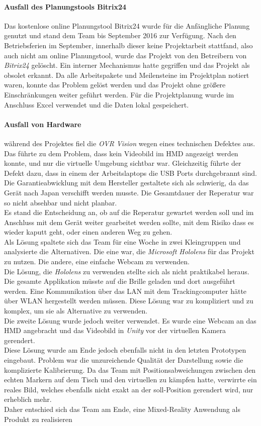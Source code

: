\paragraph{Ausfall des Planungstools Bitrix24} Das kostenlose online Planungstool Bitrix24 wurde für die Anfängliche Planung genutzt und stand dem Team bis September 2016 zur Verfügung. Nach den Betriebsferien im September, innerhalb dieser keine Projektarbeit stattfand, also auch nicht am online Planungstool, wurde das Projekt von den Betreibern von \textit{Bitrix24} gelöscht. Ein interner Mechanismus hatte gegriffen und das Projekt als obsolet erkannt. Da alle Arbeitspakete und Meilensteine im Projektplan notiert waren, konnte das Problem gelöst werden und das Projekt ohne größere Einschränkungen weiter geführt werden. Für die Projektplanung wurde im Anschluss Excel verwendet und die Daten lokal gespeichert.

\paragraph{Ausfall von Hardware} während des Projektes fiel die \textit{OVR Vision} wegen eines technischen Defektes aus. Das führte zu dem Problem, dass kein Videobild im HMD angezeigt werden konnte, und nur die virtuelle Umgebung sichtbar war. Gleichzeitig führte der Defekt dazu, dass in einem der Arbeitslaptops die USB Ports durchgebrannt sind. Die Garantieabwicklung mit dem Hersteller gestaltete sich als schwierig, da das Gerät nach Japan verschifft werden musste. Die Gesamtdauer der Reperatur war so nicht absehbar und nicht planbar. \\
Es stand die Entscheidung an, ob auf die Reperatur gewartet werden soll und im Anschluss mit dem Gerät weiter gearbeitet werden sollte, mit dem Risiko dass es wieder kaputt geht, oder einen anderen Weg zu gehen.\\
Als Lösung spaltete sich das Team für eine Woche in zwei Kleingruppen und analysierte die Alternativen. Die eine war, die \textit{Microsoft Hololens} für das Projekt zu nutzen. Die andere, eine einfache Webcam zu verwenden.\\
Die Lösung, die \textit{Hololens} zu verwenden stellte sich als nicht praktikabel heraus. Die gesamte Applikation müsste auf die Brille geladen und dort ausgeführt werden. Eine Kommunikation über das LAN mit dem Trackingcomputer hätte über WLAN hergestellt werden müssen. Diese Lösung war zu kompliziert und zu komplex, um sie als Alternative zu verwenden.\\
Die zweite Lösung wurde jedoch weiter verwendet. Es wurde eine Webcam an das HMD angebracht und das Videobild in \textit{Unity} vor der virtuellen Kamera gerendert.\\
Diese Lösung wurde am Ende jedoch ebenfalls nicht in den letzten Prototypen eingebaut. Problem war die unzureichende Qualität der Darstellung sowie die komplizierte Kalibrierung. Da das Team mit Positionsabweichungen zwischen den echten Markern auf dem Tisch und den virtuellen zu kämpfen hatte, verwirrte ein reales Bild, welches ebenfalls nicht exakt an der soll-Position gerendert wird, nur erheblich mehr.\\
Daher entschied sich das Team am Ende, eine Mixed-Reality Anwendung als Produkt zu realisieren 


